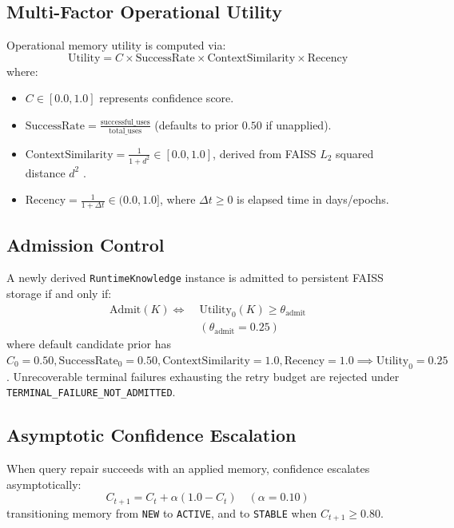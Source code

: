 \subsection{Multi-Factor Operational Utility}
Operational memory utility is computed via:
\begin{equation}
\text{Utility} = C \times \text{SuccessRate} \times \text{ContextSimilarity} \times \text{Recency}
\end{equation}
where:
\begin{itemize}
    \item $C \in [0.0, 1.0]$ represents confidence score.
    \item $\text{SuccessRate} = \frac{\text{successful\_uses}}{\text{total\_uses}}$ (defaults to prior $0.50$ if unapplied).
    \item $\text{ContextSimilarity} = \frac{1}{1 + d^2} \in [0.0, 1.0]$, derived from FAISS $L_2$ squared distance $d^2$ \cite{johnson2021faiss}.
    \item $\text{Recency} = \frac{1}{1 + \Delta t} \in (0.0, 1.0]$, where $\Delta t \ge 0$ is elapsed time in days/epochs.
\end{itemize}

\subsection{Admission Control}
A newly derived \texttt{Runtime\-Knowledge} instance is admitted to persistent FAISS storage if and only if:
\begin{equation}
\begin{aligned}
\text{Admit}(K) \iff \; & \text{Utility}_0(K) \ge \theta_{\text{admit}} \\
& (\theta_{\text{admit}} = 0.25)
\end{aligned}
\end{equation}
where default candidate prior has $C_0 = 0.50, \text{SuccessRate}_0 = 0.50, \text{ContextSimilarity} = 1.0, \text{Recency} = 1.0 \implies \text{Utility}_0 = 0.25$. Unrecoverable terminal failures exhausting the retry budget are rejected under \texttt{TERMINAL\_\allowbreak FAILURE\_\allowbreak NOT\_\allowbreak ADMITTED}.

\subsection{Asymptotic Confidence Escalation}
When query repair succeeds with an applied memory, confidence escalates asymptotically:
\begin{equation}
C_{t+1} = C_t + \alpha (1.0 - C_t) \quad (\alpha = 0.10)
\end{equation}
transitioning memory from \texttt{NEW} to \texttt{ACTIVE}, and to \texttt{STABLE} when $C_{t+1} \ge 0.80$.

